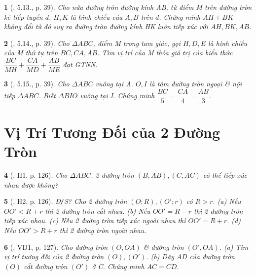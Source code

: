 \documentclass{article}
\newtheorem{baitoan}{}
\begin{document}
\begin{baitoan}[\cite{TLCT_THCS_Toan_9_hinh_hoc}, 5.13., p. 39]
	Cho nửa đường tròn đường kính AB, từ điểm M trên đường tròn kẻ tiếp tuyến $d$. $H,K$ là hình chiếu của $A,B$ trên $d$. Chứng minh $AH + BK$ không đổi từ đó suy ra đường tròn đường kính HK luôn tiếp xúc với $AH,BK,AB$.
\end{baitoan}

\begin{baitoan}[\cite{TLCT_THCS_Toan_9_hinh_hoc}, 5.14., p. 39]
	Cho $\Delta ABC$, điểm M trong tam giác, gọi $H,D,E$ là hình chiếu của M thứ tự trên $BC,CA,AB$. Tìm vị trí của M thỏa giá trị của biểu thức $\dfrac{BC}{MH} + \dfrac{CA}{MD} + \dfrac{AB}{ME}$ đạt {\rm GTNN}.
\end{baitoan}

\begin{baitoan}[\cite{TLCT_THCS_Toan_9_hinh_hoc}, 5.15., p. 39]
	Cho $\Delta ABC$ vuông tại A. $O,I$ là tâm đường tròn ngoại \& nội tiếp $\Delta ABC$. Biết $\Delta BIO$ vuông tại I. Chứng minh $\dfrac{BC}{5} = \dfrac{CA}{4} = \dfrac{AB}{3}$.
\end{baitoan}


\section{Vị Trí Tương Đối của 2 Đường Tròn}

\begin{baitoan}[\cite{Binh_boi_duong_Toan_9_tap_1}, H1, p. 126]
	Cho $\Delta ABC$. 2 đường tròn $(B,AB),(C,AC)$ có thể tiếp xúc nhau được không?
\end{baitoan}

\begin{baitoan}[\cite{Binh_boi_duong_Toan_9_tap_1}, H2, p. 126]
	{\rm Đ{\tt/}S?} Cho 2 đường tròn $(O;R),(O';r)$ có $R > r$. (a) Nếu $OO' < R + r$ thì 2 đường tròn cắt nhau. (b) Nếu $OO' = R - r$ thì 2 đường tròn tiếp xúc nhau. (c) Nếu 2 đường tròn tiếp xúc ngoài nhau thì $OO' = R + r$. (d) Nếu $OO' > R + r$ thì 2 đường tròn ngoài nhau.
\end{baitoan}

\begin{baitoan}[\cite{Binh_boi_duong_Toan_9_tap_1}, VD1, p. 127]
	Cho đường tròn $(O,OA)$ \& đường tròn $(O',OA)$. (a) Tìm vị trí tương đối của 2 đường tròn $(O),(O')$. (b) Dây AD của đường tròn $(O)$ cắt đường tròn $(O')$ ở C. Chứng minh $AC = CD$.
\end{baitoan}
\end{document}
